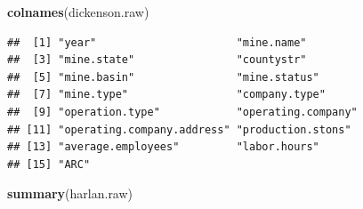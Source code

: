 \documentclass[12pt,]{article}
\newenvironment{Shaded}{\begin{snugshade}}{\end{snugshade}}
\newcommand{\KeywordTok}[1]{\textcolor[rgb]{0.13,0.29,0.53}{\textbf{#1}}}
\newcommand{\NormalTok}[1]{#1}
\begin{document}
\begin{Shaded}
\begin{Highlighting}[]
\KeywordTok{colnames}\NormalTok{(dickenson.raw)}
\end{Highlighting}
\end{Shaded}

\begin{verbatim}
##  [1] "year"                      "mine.name"                
##  [3] "mine.state"                "countystr"                
##  [5] "mine.basin"                "mine.status"              
##  [7] "mine.type"                 "company.type"             
##  [9] "operation.type"            "operating.company"        
## [11] "operating.company.address" "production.stons"         
## [13] "average.employees"         "labor.hours"              
## [15] "ARC"
\end{verbatim}

\begin{Shaded}
\begin{Highlighting}[]
\KeywordTok{summary}\NormalTok{(harlan.raw)}
\end{Highlighting}
\end{Shaded}
\end{document}
